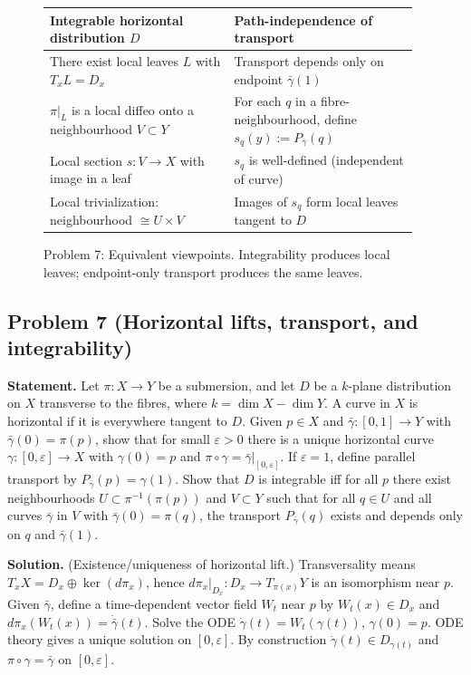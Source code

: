 \documentclass[12pt,a4paper]{article}
\theoremstyle{plain}
\theoremstyle{definition}      %
\begin{document}
\begin{figure}[h]
	\centering
	\renewcommand{\arraystretch}{1.35}
	\begin{tabular}{|p{0.48\linewidth}|p{0.48\linewidth}|}
		\hline
		\textbf{Integrable horizontal distribution $D$} & \textbf{Path-independence of transport} \\
		\hline
		There exist local leaves $L$ with $T_xL=D_x$ & Transport depends only on endpoint $\bar\gamma(1)$ \\
		\hline
		$\pi|_{L}$ is a local diffeo onto a neighbourhood $V\subset Y$ &
		For each $q$ in a fibre-neighbourhood, define $s_q(y):=P_{\bar\gamma}(q)$ \\
		\hline
		Local section $s:V\to X$ with image in a leaf & $s_q$ is well-defined (independent of curve) \\
		\hline
		Local trivialization: neighbourhood $\cong U \times V$ &
		Images of $s_q$ form local leaves tangent to $D$ \\
		\hline
	\end{tabular}
	\caption{Problem 7: Equivalent viewpoints. Integrability produces local leaves; endpoint-only transport produces the same leaves.}
\end{figure}


\subsection*{Problem 7 (Horizontal lifts, transport, and integrability)}
\textbf{Statement.}
Let $\pi:X\to Y$ be a submersion, and let $D$ be a $k$-plane distribution on $X$ transverse to the fibres,
where $k=\dim X-\dim Y$.
A curve in $X$ is horizontal if it is everywhere tangent to $D$.
Given $p\in X$ and $\bar\gamma:[0,1]\to Y$ with $\bar\gamma(0)=\pi(p)$, show that for small $\varepsilon>0$
there is a unique horizontal curve $\gamma:[0,\varepsilon]\to X$ with $\gamma(0)=p$ and
$\pi\circ\gamma=\bar\gamma|_{[0,\varepsilon]}$.
If $\varepsilon=1$, define parallel transport by $P_{\bar\gamma}(p)=\gamma(1)$.
Show that $D$ is integrable iff for all $p$ there exist neighbourhoods
$U\subset \pi^{-1}(\pi(p))$ and $V\subset Y$ such that for all $q\in U$ and all curves $\bar\gamma$ in $V$
with $\bar\gamma(0)=\pi(q)$, the transport $P_{\bar\gamma}(q)$ exists and depends only on $q$ and
$\bar\gamma(1)$.

\textbf{Solution.}
(Existence/uniqueness of horizontal lift.)
Transversality means $T_xX = D_x\oplus \ker(d\pi_x)$, hence $d\pi_x|_{D_x}:D_x\to T_{\pi(x)}Y$ is an
isomorphism near $p$.
Given $\bar\gamma$, define a time-dependent vector field $W_t$ near $p$ by
$W_t(x)\in D_x$ and $d\pi_x(W_t(x))=\dot{\bar\gamma}(t)$.
Solve the ODE $\dot\gamma(t)=W_t(\gamma(t))$, $\gamma(0)=p$.
ODE theory gives a unique solution on $[0,\varepsilon]$.
By construction $\dot\gamma(t)\in D_{\gamma(t)}$ and $\pi\circ\gamma=\bar\gamma$ on $[0,\varepsilon]$.
\end{document}
